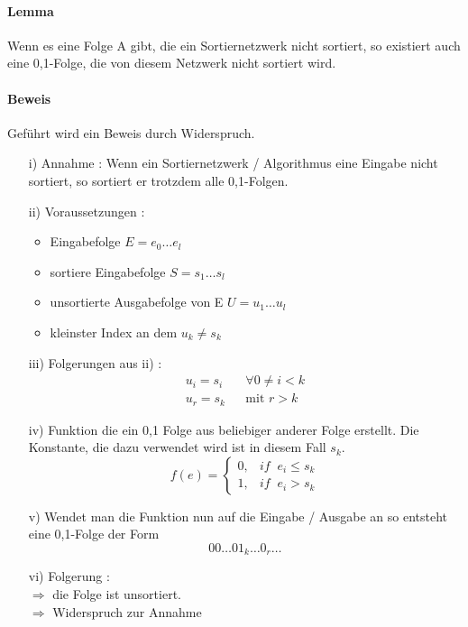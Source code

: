 \documentclass[11pt]{article}
\begin{document}
\paragraph{Lemma}
Wenn es eine Folge A gibt, die ein Sor\-tier\-netz\-werk nicht sortiert, so existiert auch eine 0,1-Folge, die von diesem Netzwerk nicht sortiert wird.
\paragraph{Beweis} Geführt wird ein Beweis durch Widerspruch. 
\begin{enumerate}
\item[i)] Annahme : Wenn ein Sortiernetzwerk / Algorithmus eine Eingabe nicht sortiert, so sortiert er trotzdem alle 0,1-Folgen.
\item[ii)] Voraussetzungen : \begin{itemize}
\item Eingabefolge $E = e_0 \dots e_l$
\item sortiere Eingabefolge $ S = s_1 \dots s_l$
\item unsortierte Ausgabefolge von E $ U = u_1 \dots u_l $
\item kleinster Index an dem $u_k \neq s_k$ 
\end{itemize}
\item[iii)] Folgerungen aus ii) :
\begin{eqnarray}
u_i = s_i & & \forall 0 \neq i < k \\
u_r = s_k & & \text{mit } r > k
\end{eqnarray}
\item[iv)] Funktion die ein 0,1 Folge aus beliebiger anderer Folge erstellt. Die Konstante, die dazu verwendet wird ist in diesem Fall $s_k$.
\begin{equation}
f(e) = \begin{cases} 0 , & if \;\; e_i \leq s_k \\
    1 , & if \;\; e_i > s_k
    \end{cases}
\label{eq:cases}
\end{equation}
\item[v)] Wendet man die Funktion nun auf die Eingabe / Ausgabe an so entsteht eine 0,1-Folge der Form 
\begin{equation}
00 \dots 01_k\dots0_r \dots
\label{eq:01folge}
\end{equation}
\item[vi)] Folgerung : \\
$\Rightarrow$ die Folge ist unsortiert.\\
$\Rightarrow$ Widerspruch zur Annahme
\end{enumerate}
\end{document}
